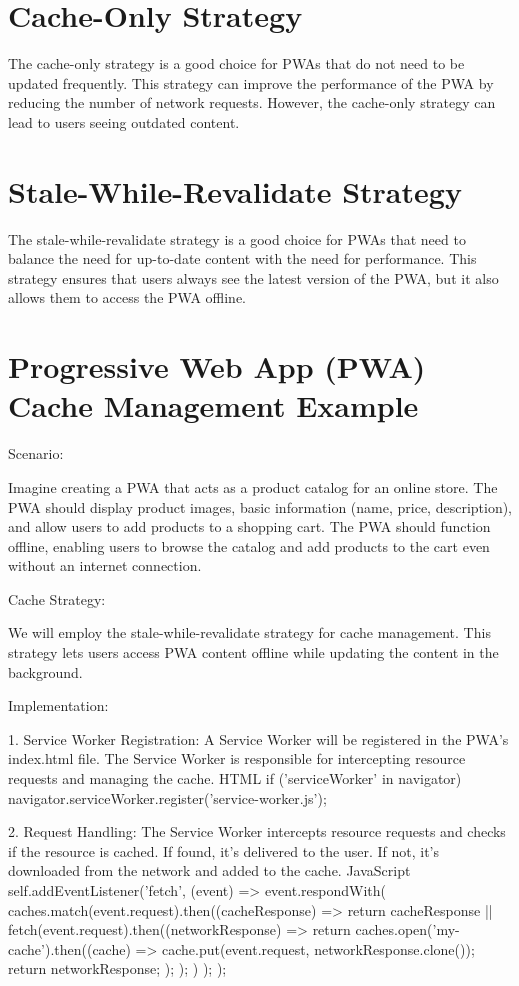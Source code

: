 \documentclass{report}
\begin{document}
\section{Cache-Only Strategy}\label{Cache-Only Strategy}
The cache-only strategy is a good choice for PWAs that do not need to be updated frequently. This strategy can improve the performance of the PWA by reducing the number of network requests. However, the cache-only strategy can lead to users seeing outdated content.

\section{Stale-While-Revalidate Strategy}\label{Stale-While-Revalidate Strategy}
The stale-while-revalidate strategy is a good choice for PWAs that need to balance the need for up-to-date content with the need for performance. This strategy ensures that users always see the latest version of the PWA, but it also allows them to access the PWA offline. \cite{cacheapi}

\section{Progressive Web App (PWA) Cache Management Example}\label{Progressive Web App (PWA) Cache Management Example}
Scenario:

Imagine creating a PWA that acts as a product catalog for an online store. The PWA should display product images, basic information (name, price, description), and allow users to add products to a shopping cart. The PWA should function offline, enabling users to browse the catalog and add products to the cart even without an internet connection.

Cache Strategy:

We will employ the stale-while-revalidate strategy for cache management. This strategy lets users access PWA content offline while updating the content in the background.

Implementation:

1. Service Worker Registration: A Service Worker will be registered in the PWA's index.html file. The Service Worker is responsible for intercepting resource requests and managing the cache.
HTML
if ('serviceWorker' in navigator) {
  navigator.serviceWorker.register('service-worker.js');
}

2. Request Handling: The Service Worker intercepts resource requests and checks if the resource is cached. If found, it's delivered to the user. If not, it's downloaded from the network and added to the cache.
JavaScript
self.addEventListener('fetch', (event) => {
  event.respondWith(
    caches.match(event.request).then((cacheResponse) => {
      return cacheResponse || fetch(event.request).then((networkResponse) => {
        return caches.open('my-cache').then((cache) => {
          cache.put(event.request, networkResponse.clone());
          return networkResponse;
        });
      });
    })
  );
});
\end{document}
